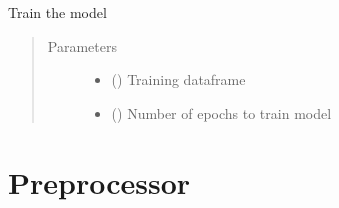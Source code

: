 \documentclass[letterpaper,10pt,english]{sphinxmanual}
\begin{document}
\begin{fulllineitems}
\begin{fulllineitems}
\label{\detokenize{dc_custom_model:src.domain_classifier.custom_model.CustomModel.train_model}}
\sphinxAtStartPar
Train the model
\begin{quote}\begin{description}
\item[{Parameters}] \leavevmode\begin{itemize}
\item {} 
\sphinxAtStartPar
{} () \textendash{} Training dataframe

\item {} 
\sphinxAtStartPar
{} () \textendash{} Number of epochs to train model

\end{itemize}

\end{description}\end{quote}

\end{fulllineitems}


\end{fulllineitems}



\chapter{Preprocessor}
\label{\detokenize{dc_preprocessor:preprocessor}}\label{\detokenize{dc_preprocessor::doc}}\label{\detokenize{dc_preprocessor:module-src.domain_classifier.preprocessor}}
\end{document}
